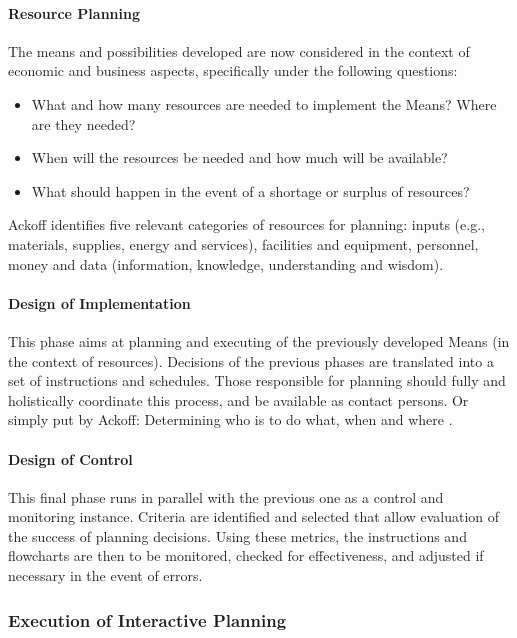 \documentclass[a4paper,12pt]{scrartcl}
\begin{document}
\paragraph{Resource  Planning} 

The means and possibilities developed are now considered in the context of economic and business aspects, specifically under the following questions:
\begin{itemize}
\item What  and how many resources are needed to implement the Means? Where are they needed?
\item When will the resources be needed and how much will be available?
\item What should happen in the event of a shortage or surplus of resources?
\end{itemize}

Ackoff identifies five relevant categories of resources for planning: inputs (e.g., materials, supplies, energy and services), facilities and equipment, personnel, money and data (information, knowledge, understanding and wisdom).



\paragraph{Design of Implementation} 

This phase aims at planning and executing of the previously developed Means (in the context of resources). Decisions of the previous phases are translated into a set of instructions and schedules. Those responsible for planning should fully and holistically coordinate this process, and be available as contact persons. Or simply put by Ackoff: \glqq
Determining who is to do what, when and where
\grqq.\cite{ackoff:2001}


\paragraph{Design of Control} 

This final phase runs in parallel with the previous one as a control and monitoring instance. Criteria are identified and selected that allow evaluation of the success of planning decisions. Using these metrics, the instructions and flowcharts are then to be monitored, checked for effectiveness, and adjusted if necessary in the event of errors.


\subsubsection{Execution of Interactive Planning}
\end{document}
